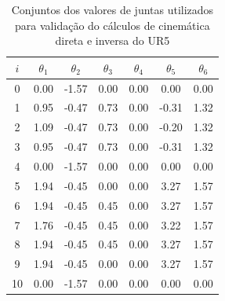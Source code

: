 \begin{table}
	\centering
	\caption{Conjuntos dos valores de juntas utilizados para validação do cálculos de cinemática direta e
		inversa do UR5
	}
	\label{tab:conjuntos-de-valores-de-juntas}
	\begin{tabular}{c|c|c|c|c|c|c}
		\hline
		\rowcolor{white} 					$i$ & $\theta_{1} $ & $\theta_{2}$ & $\theta_{3}$ & $\theta_{4}$ & $\theta_{5}$ & $\theta_{6}$ \\ 
		\hline 
		\rowcolor{home-gray} 				0   &    0.00       &     -1.57    &     0.00     &     0.00     &     0.00     &     0.00     \\ 
		\hline                 
		\rowcolor{pre-post-grasping-gray} 	1   &    0.95       &     -0.47    &     0.73     &     0.00     &    -0.31     &     1.32     \\ 
		\hline                 
		\rowcolor{grasping-gray} 			2   &    1.09       &     -0.47    &     0.73     &     0.00     &    -0.20     &     1.32     \\ 
		\hline                 
		\rowcolor{pre-post-grasping-gray} 	3   &    0.95       &     -0.47    &     0.73     &     0.00     &    -0.31     &     1.32     \\ 
		\hline                 
		\rowcolor{home-gray} 				4   &    0.00       &     -1.57    &     0.00     &     0.00     &     0.00     &     0.00     \\ 
		\hline                 
		\rowcolor{pre-post-grasping-gray} 	5   &    1.94       &     -0.45    &     0.00     &     0.00     &     3.27     &     1.57     \\ 
		\hline                 
		\rowcolor{pre-post-grasping-gray} 	6   &    1.94       &     -0.45    &     0.45     &     0.00     &     3.27     &     1.57     \\ 
		\hline                 
		\rowcolor{grasping-gray} 			7   &    1.76       &     -0.45    &     0.45     &     0.00     &     3.22     &     1.57     \\ 
		\hline                 
		\rowcolor{pre-post-grasping-gray} 	8   &    1.94       &     -0.45    &     0.45     &     0.00     &     3.27     &     1.57     \\ 
		\hline                 
		\rowcolor{pre-post-grasping-gray} 	9   &    1.94       &     -0.45    &     0.00     &     0.00     &     3.27     &     1.57     \\ 
		\hline 
		\rowcolor{home-gray} 				10  &    0.00       &     -1.57    &     0.00     &     0.00     &     0.00     &     0.00     \\ 

\end{tabular}
\end{table}
